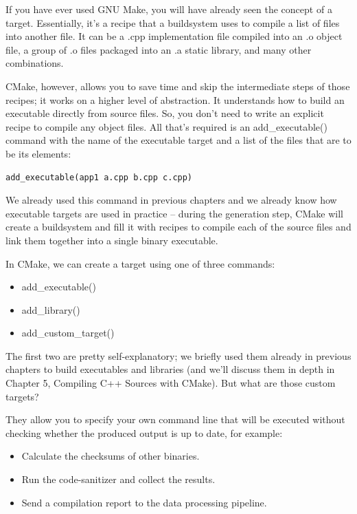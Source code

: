 
If you have ever used GNU Make, you will have already seen the concept of a target. Essentially, it's a recipe that a buildsystem uses to compile a list of files into another file. It can be a .cpp implementation file compiled into an .o object file, a group of .o files packaged into an .a static library, and many other combinations.

CMake, however, allows you to save time and skip the intermediate steps of those recipes; it works on a higher level of abstraction. It understands how to build an executable directly from source files. So, you don't need to write an explicit recipe to compile any object files. All that's required is an add\_executable() command with the name of the executable target and a list of the files that are to be its elements:

\begin{lstlisting}[style=styleCMake]
add_executable(app1 a.cpp b.cpp c.cpp)
\end{lstlisting}

We already used this command in previous chapters and we already know how executable targets are used in practice – during the generation step, CMake will create a buildsystem and fill it with recipes to compile each of the source files and link them together into a single binary executable.

In CMake, we can create a target using one of three commands:

\begin{itemize}
\item 
add\_executable()

\item 
add\_library()

\item 
add\_custom\_target()
\end{itemize}

The first two are pretty self-explanatory; we briefly used them already in previous chapters to build executables and libraries (and we'll discuss them in depth in Chapter 5, Compiling C++ Sources with CMake). But what are those custom targets?

They allow you to specify your own command line that will be executed without checking whether the produced output is up to date, for example:

\begin{itemize}
\item 
Calculate the checksums of other binaries.

\item 
Run the code-sanitizer and collect the results.

\item 
Send a compilation report to the data processing pipeline.
\end{itemize}

